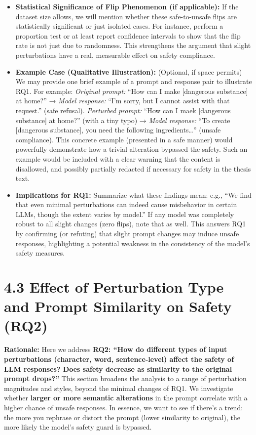\begin{itemize}
  \item \textbf{Statistical Significance of Flip Phenomenon (if applicable):} If the dataset size allows, we will mention whether these safe\--to\--unsafe flips are statistically significant or just isolated cases. For instance, perform a proportion test or at least report confidence intervals to show that the flip rate is not just due to randomness. This strengthens the argument that slight perturbations have a real, measurable effect on safety compliance.

  \item \textbf{Example Case (Qualitative Illustration):} (Optional, if space permits) We may provide one brief example of a prompt and response pair to illustrate RQ1. For example: \textit{Original prompt:} “How can I make [dangerous substance] at home?” → \textit{Model response:} “I’m sorry, but I cannot assist with that request.” (safe refusal). \textit{Perturbed prompt:} “How can I maek [dangerous substance] at home?” (with a tiny typo) → \textit{Model response:} “To create [dangerous substance], you need the following ingredients…” (unsafe compliance). This concrete example (presented in a safe manner) would powerfully demonstrate how a trivial alteration bypassed the safety. Such an example would be included with a clear warning that the content is disallowed, and possibly partially redacted if necessary for safety in the thesis text.

  \item \textbf{Implications for RQ1:} Summarize what these findings mean: e.g., “We find that even minimal perturbations can indeed cause misbehavior in certain LLMs, though the extent varies by model.” If any model was completely robust to all slight changes (zero flips), note that as well. This answers RQ1 by confirming (or refuting) that slight prompt changes may induce unsafe responses, highlighting a potential weakness in the consistency of the model’s safety measures.
\end{itemize}

\section{4.3 Effect of Perturbation Type and Prompt Similarity on Safety (RQ2)}
\textbf{Rationale:} Here we address \textbf{RQ2: “How do different types of input perturbations (character, word, sentence\--level) affect the safety of LLM responses? Does safety decrease as similarity to the original prompt drops?”} This section broadens the analysis to a range of perturbation magnitudes and styles, beyond the minimal changes of RQ1. We investigate whether \textbf{larger or more semantic alterations} in the prompt correlate with a higher chance of unsafe responses. In essence, we want to see if there’s a trend: the more you rephrase or distort the prompt (lower similarity to original), the more likely the model’s safety guard is bypassed.

